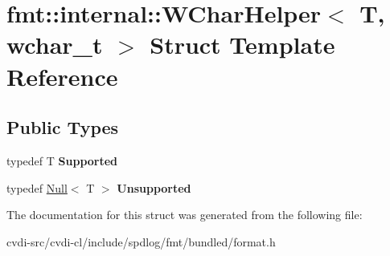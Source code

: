 \hypertarget{structfmt_1_1internal_1_1WCharHelper_3_01T_00_01wchar__t_01_4}{}\section{fmt\+:\+:internal\+:\+:W\+Char\+Helper$<$ T, wchar\+\_\+t $>$ Struct Template Reference}
\label{structfmt_1_1internal_1_1WCharHelper_3_01T_00_01wchar__t_01_4}
\subsection*{Public Types}
\begin{DoxyCompactItemize}
\item 
typedef T {\bfseries Supported}\hypertarget{structfmt_1_1internal_1_1WCharHelper_3_01T_00_01wchar__t_01_4_a5e068234d7ece2fd0e80ebd3b3b79f02}{}\label{structfmt_1_1internal_1_1WCharHelper_3_01T_00_01wchar__t_01_4_a5e068234d7ece2fd0e80ebd3b3b79f02}

\item 
typedef \hyperlink{structfmt_1_1internal_1_1Null}{Null}$<$ T $>$ {\bfseries Unsupported}\hypertarget{structfmt_1_1internal_1_1WCharHelper_3_01T_00_01wchar__t_01_4_a9922ab13c42de66fe6f42006e999b539}{}\label{structfmt_1_1internal_1_1WCharHelper_3_01T_00_01wchar__t_01_4_a9922ab13c42de66fe6f42006e999b539}

\end{DoxyCompactItemize}


The documentation for this struct was generated from the following file\+:\begin{DoxyCompactItemize}
\item 
cvdi-\/src/cvdi-\/cl/include/spdlog/fmt/bundled/format.\+h\end{DoxyCompactItemize}
